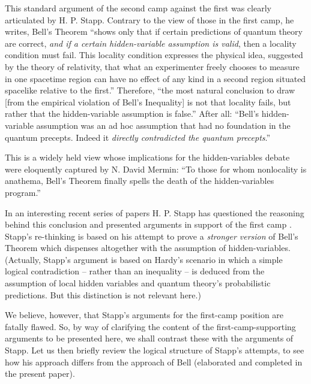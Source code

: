 \documentclass[aps,prc,onecolumn,12pt,nofootinbib]{revtex4-2}
\begin{document}
This standard argument of the second camp against the first
was clearly articulated by H. P. Stapp.  Contrary to the view of
those in the first camp, he writes, Bell's Theorem ``shows only that if
certain predictions of quantum theory are correct, \emph{and if a certain
hidden-variable assumption is valid}, then a locality condition
must fail.  This locality condition expresses the physical idea,
suggested by the theory of relativity, that what an experimenter
freely chooses to measure in one spacetime region can have no effect
of any kind in a second region situated spacelike relative to the
first.''  Therefore,
``the most natural conclusion to draw [from the empirical violation of
Bell's Inequality] is not that locality fails, but
rather that the hidden-variable assumption is false.''  After all:
``Bell's
hidden-variable assumption was an ad hoc assumption that had no
foundation in the quantum precepts.  Indeed it \emph{directly
contradicted the quantum precepts}.''  \cite{stapp:btwhv}

This is a widely held view whose implications for the hidden-variables
debate were eloquently captured by N. David Mermin:  ``To
those for whom nonlocality is anathema, Bell's Theorem finally spells
the death of the hidden-variables program.'' \cite{merminquote}

In an interesting recent series of papers
H. P. Stapp has questioned the reasoning behind this
conclusion and presented arguments in support of the first camp
\cite{stapp:btwhv,stapp1,stapp2}.
Stapp's re-thinking is based on his attempt to
prove a \emph{stronger version} of Bell's Theorem which dispenses
altogether with the assumption of hidden-variables.
(Actually, Stapp's argument is based on Hardy's scenario \cite{hardy}
in which a simple logical contradiction -- rather than an inequality
-- is deduced from the assumption of
local hidden variables and quantum theory's probabilistic
predictions.  But this distinction is not relevant here.)

We believe, however, that Stapp's arguments for the first-camp
position are fatally flawed.  So, by way of clarifying the content of
the first-camp-supporting arguments to be presented here, we shall
contrast these with the arguments of Stapp.  Let us then briefly
review the logical structure of Stapp's attempts, to see how his
approach differs from the approach of Bell (elaborated and completed
in the present paper).
\end{document}

